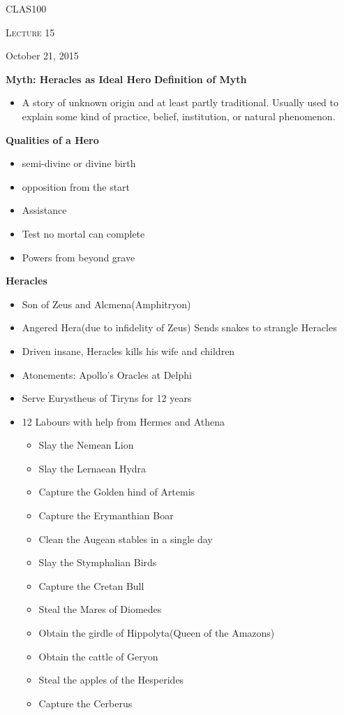 \documentclass[12pt,a4paper]{report}
\begin{document}
	\centering
	{\scshape\LARGE CLAS100\par}
	{\scshape\Large Lecture 15\par}
	{\large October 21, 2015}
	\vspace{1.5cm}

\textbf{Myth: Heracles as Ideal Hero}
\textbf{Definition of Myth}
\begin{itemize}
\item A story of unknown origin and at least partly traditional. Usually used to explain some kind of practice, belief, institution, or natural phenomenon.
\end{itemize}
\textbf{Qualities of a Hero}
\begin{itemize}
\item semi-divine or divine birth
\item opposition from the start
\item Assistance
\item Test no mortal can complete
\item Powers from beyond grave
\end{itemize}

\textbf{Heracles}
\begin{itemize}
\item Son of Zeus and Alcmena(Amphitryon)
\item Angered Hera(due to infidelity of Zeus) Sends snakes to strangle Heracles
\item Driven insane, Heracles kills his wife and children
\item Atonements: Apollo's Oracles at Delphi
\item Serve Eurystheus of Tiryns for 12 years
\item 12 Labours with help from Hermes and Athena
\begin{itemize}
\item Slay the Nemean Lion
\item Slay the Lernaean Hydra
\item Capture the Golden hind of Artemis
\item Capture the Erymanthian Boar
\item Clean the Augean stables in a single day
\item Slay the Stymphalian Birds
\item Capture the Cretan Bull
\item Steal the Mares of Diomedes
\item Obtain the girdle of Hippolyta(Queen of the Amazons)
\item Obtain the cattle of Geryon
\item Steal the apples of the Hesperides
\item Capture the Cerberus
\end{itemize}
\end{itemize}
\end{document}
